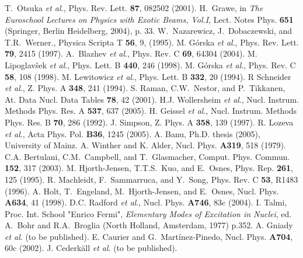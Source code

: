 \documentclass[prc,twocolumn,amssymb,amsmath,showpacs,superscriptaddress]{revtex4}
\def\Journal#1#2#3#4{{#1} {\bf #2}, #3 (#4)}
\def\NIMR{Nucl. Instrum. Methods Phys. Res. A}
\def\NIMB{Nucl. Instrum. Methods Phys. Res. B}
\def\ADNDT{At. Data Nucl. Data Tables}
\def\NPA{Nucl. Phys.}
\def\CPC{Comput. Phys. Commun.}
\def\PLB{Phys. Lett. B}
\def\PRL{Phys. Rev. Lett.}
\def\PRep{Phys. Rep.}
\def\PRC{Phys. Rev. C}
\def\ZPA{Z. Phys. A}
\def\ActaB{Acta Phys. Pol.}
\begin{document}
\begin{thebibliography}{100}
 T.~Otsuka \textit{et al.},
\Journal{\PRL}{87}{082502}{2001}.
 H.~Grawe, in \textit{The Euroschool Lectures on Physics with Exotic Beams,
Vol.I}, Lect. Notes Phys. \textbf{651} (Springer, Berlin
Heidelberg, 2004), p. 33.
 W.~Nazarewicz, J.~Dobaczewski, and T.R.~Werner., Physica Scripta T
\textbf{56}, 9, (1995).
 M. G{\'o}rska \textit{et al}.,
\Journal{\PRL}{79}{2415}{1997}.
 A.~Blazhev \textit{et al}.,
\Journal{\PRC}{69}{64304}{2004}.
 M. Lipoglav\v{s}ek \textit{et al}.,
\Journal{\PLB}{440}{246}{1998}.
 M. G{\'o}rska \textit{et al}., \Journal{\PRC}{58}{108}{1998}.
 M. Lewitowicz \textit{et al}.,
\Journal{\PLB}{332}{20}{1994}.
 R Schneider \textit{et al}.,
\Journal{\ZPA}{348}{241}{1994}.
 S. Raman, C.W.~Nestor, and P.~Tikkanen, \Journal{\ADNDT}{78}{42}{2001}.
 H.J. Wollersheim \textit{et al}.,
\Journal{\NIMR}{537}{637}{2005}.
 H. Geissel \textit{et al}., \Journal{\NIMB}{70}{286}{1992}.
 J. Simpson, \Journal{\ZPA}{358}{139}{1997}.
 R. Lozeva \textit{et al}., \Journal{\ActaB}
{B36}{1245}{2005}.
 A. Banu, Ph.D. thesis (2005), University of Mainz.
 A. Winther and K. Alder,
\Journal{\NPA}{A319}{518}{1979}.
 C.A. Bertulani, C.M.~Campbell, and T.~Glasmacher,
\Journal{\CPC}{152}{317}{2003}.
 M. Hjorth-Jensen, T.T.S.~Kuo, and E.~Osnes,
\Journal{\PRep}{261}{125}{1995}.
 R. Machleidt, F.~Sammarruca, and Y.~Song,
\Journal{\PRC}{53}{R1483}{1996}.
 A. Holt, T.~Engeland, M.~Hjorth-Jensen, and E.~Osnes, \Journal{\NPA}{A634}{41}{1998}.
 D.C. Radford \textit{et al}.,
\Journal{\NPA}{A746}{83c}{2004}.
 I. Talmi, Proc. Int. School "Enrico Fermi",
\textit{Elementary Modes of Excitation in Nuclei}, ed. A.~Bohr and
R.A.~Broglia (North Holland, Amsterdam, 1977) p.352.
 A. Gniady \textit{et al}. (to be published).
 E. Caurier and G.~Mart{\'i}nez-Pinedo, \Journal{\NPA}{A704}{60c}{2002}.
 J. Cederk{\"a}ll \textit{et al}. (to be published).

\end{thebibliography}
\end{document}

